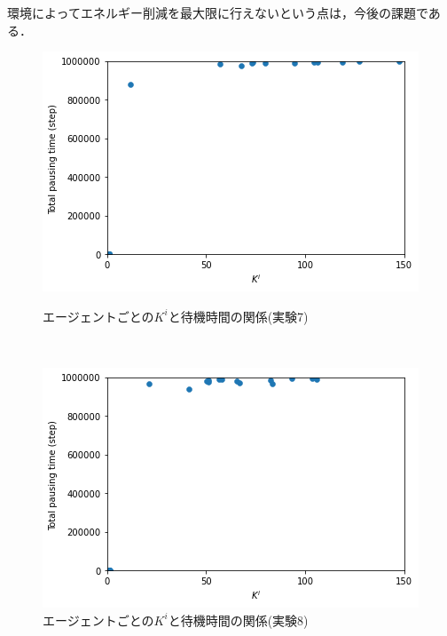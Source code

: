 \documentclass[12pt,a4j,twoside]{jarticle}
\begin{document}
  環境によってエネルギー削減を最大限に行えないという点は，今後の課題である．


  \begin{figure}
    \begin{minipage}{1.0\columnwidth}
      \centering
      \includegraphics[width=0.8\hsize]{figures/CorrectionScatter_Office_ERC.png}
      \caption{エージェントごとの$K^i$と待機時間の関係(実験7)}
      \label{fig:cscatter_ERC_Office}
    \end{minipage}
    \\[40pt]
    \begin{minipage}{1.0\columnwidth}
      \centering
      \includegraphics[width=0.8\hsize]{figures/CorrectionScatter_Complex_ERC.png}
      \caption{エージェントごとの$K^i$と待機時間の関係(実験8)}
      \label{fig:cscatter_ERC_Complex}
    \end{minipage}
  \end{figure}
\end{document}
